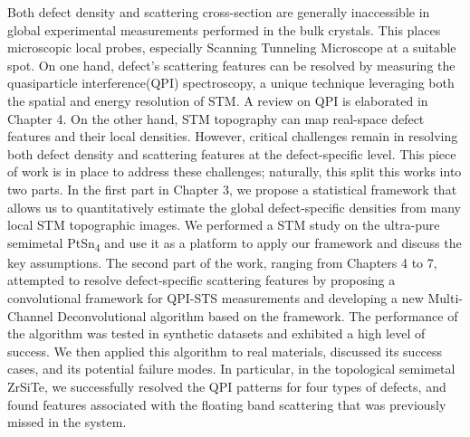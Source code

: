 Both defect density and scattering cross-section are generally inaccessible in global experimental measurements performed in the bulk crystals. This places microscopic local probes, especially Scanning Tunneling Microscope at a suitable spot. On one hand, defect's scattering features can be resolved by measuring the quasiparticle interference(QPI) spectroscopy, a unique technique leveraging both the spatial and energy resolution of \ac{STM}. A review on \ac{QPI} is elaborated in Chapter 4. On the other hand, \ac{STM} topography can map real-space defect features and their local densities. However, critical challenges remain in resolving both defect density and scattering features at the defect-specific level. This piece of work is in place to address these challenges; naturally, this split this works into two parts. In the first part in Chapter 3, we propose a statistical framework that allows us to quantitatively estimate the global defect-specific densities from many local \ac{STM} topographic images. We performed a \ac{STM} study on the ultra-pure semimetal PtSn\textsubscript{4} and use it as a platform to apply our framework and discuss the key assumptions. The second part of the work, ranging from Chapters 4 to 7, attempted to resolve defect-specific scattering features by proposing a convolutional framework for QPI-STS measurements and developing a new Multi-Channel Deconvolutional algorithm based on the framework. The performance of the algorithm was tested in synthetic datasets and exhibited a high level of success. We then applied this algorithm to real materials, discussed its success cases, and its potential failure modes. In particular, in the topological semimetal ZrSiTe, we successfully resolved the \ac{QPI} patterns for four types of defects, and found features associated with the floating band scattering that was previously missed in the system\cite{stuartQuasiparticleInterferenceObservation2022}.  
